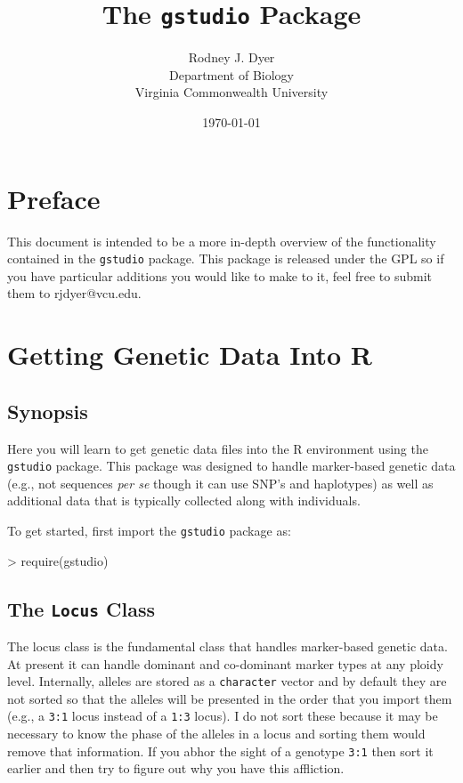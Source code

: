 \documentclass[letterpaper,twoside,openany]{book}
\title{The \texttt{gstudio} Package}
\author{Rodney J. Dyer\\Department of Biology\\Virginia Commonwealth University}
\date{\today}
\begin{document}
\pagestyle{empty}
\maketitle

\frontmatter




\chapter{Preface}

This document is intended to be a more in-depth overview of the functionality contained in the \texttt{gstudio} package.  This package is released under the GPL so if you have particular additions you would like to make to it, feel free to submit them to rjdyer@vcu.edu.

\tableofcontents


\mainmatter

\chapter{Getting Genetic Data Into R}

\section{Synopsis}

Here you will learn to get genetic data files into the R environment using the \texttt{gstudio} package.  This package was designed to handle marker-based genetic data (e.g., not sequences \emph{per se} though it can use SNP's and haplotypes) as well as additional data that is typically collected along with individuals.  

To get started, first import the \texttt{gstudio} package as:

\begin{Schunk}
\begin{Sinput}
> require(gstudio)
\end{Sinput}
\end{Schunk}



\section{The \texttt{Locus} Class}

The locus class is the fundamental class that handles marker-based genetic data.  At present it can handle dominant and co-dominant marker types at any ploidy level.  Internally, alleles are stored as a \texttt{character} vector and by default they are not sorted so that the alleles will be presented in the order that you import them (e.g., a \texttt{3:1} locus instead of a \texttt{1:3} locus).  I do not sort these because it may be necessary to know the phase of the alleles in a locus and sorting them would remove that information.  If you abhor the sight of a genotype \texttt{3:1} then sort it earlier and then try to figure out why you have this affliction.  
\end{document}
